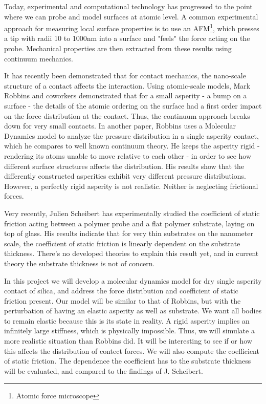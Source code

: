 \documentclass[twoside,english]{uiofysmaster}
\begin{document}
Today, experimental and computational technology has progressed to the point where we can probe and model surfaces at atomic level.
A common experimental approach for measuring local surface properties is to use an AFM\footnote{Atomic force microscope},
which presses a tip with radii 10 to 1000nm into a surface and "feels" the force acting on the probe. 
Mechanical properties are then extracted from these results using continuum mechanics.

It has recently been demonstrated that for contact mechanics, the nano-scale
structure of a contact affects the interaction. 
Using atomic-scale models, Mark Robbins and coworkers \cite{Robbins2005} demonstrated that for a small asperity - a bump on a surface - the details of the atomic ordering on the surface had a first order impact on the force distribution at the contact. 
Thus, the continuum approach breaks down for very small contacts.
In another paper, Robbins \cite{RobbinsSingleAsperity} uses a Molecular Dynamics model to analyze the pressure distribution in a single asperity contact, which he compares to well known continuum theory. He keeps the asperity rigid - rendering its atoms unable to move relative to each other - in order to see how different surface structures affects the distribution. 
His results show that the differently constructed asperities exhibit very different pressure distributions. 
However, a perfectly rigid asperity is not realistic. Neither is neglecting frictional forces.   


Very recently, Julien Scheibert \cite{Scheibert2017} has experimentally studied the coefficient of static friction  acting between a polymer probe and a flat polymer substrate, laying on top of glass. 
His results indicate that for very thin substrates on the nanometer scale, the coefficient of static friction is linearly dependent on the substrate thickness. 
There's no developed theories to explain this result yet, and in current theory the substrate thickness is not of concern.

In this project we will develop a molecular dynamics model for dry single asperity contact of silica, and address the force distribution and coefficient of static friction present.
Our model will be similar to that of Robbins, but with the perturbation of having an elastic asperity as well as substrate.
We want all bodies to remain elastic because this is its state in reality. 
A rigid asperity implies an infinitely large stiffness, which is physically impossible. 
Thus, we will simulate a more realistic situation than Robbins did.
It will be interesting to see if or how this affects the distribution of contect forces.
We will also compute the coefficient of static friction.
The dependence the coefficient has to the substrate thickness will be evaluated, and compared to the findings of J. Scheibert. 
\end{document}

